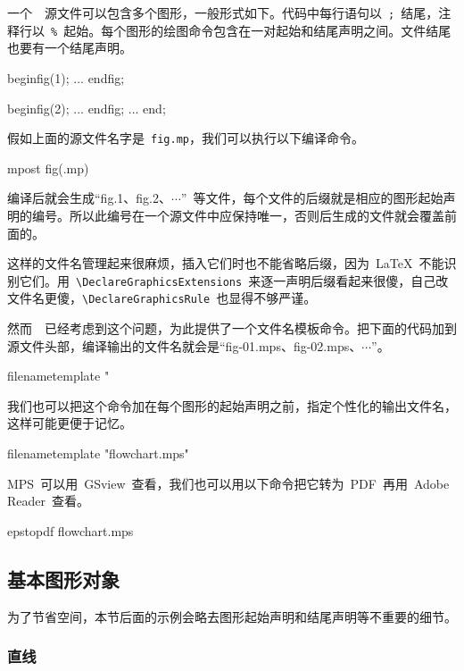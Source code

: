 一个~\MP~源文件可以包含多个图形，一般形式如下。代码中每行语句以~\verb|;|~结尾，注释行以~\verb|%|~起始。每个图形的绘图命令包含在一对起始和结尾声明之间。文件结尾也要有一个结尾声明。
\begin{code}
beginfig(1); %
...          %
endfig;      %

beginfig(2);
...
endfig;
...
end;         %
\end{code}

假如上面的源文件名字是~\verb|fig.mp|，我们可以执行以下编译命令。
\begin{code}
mpost fig(.mp)
\end{code}

编译后就会生成“fig.1、fig.2、$\cdots$”~等文件，每个文件的后缀就是相应的图形起始声明的编号。所以此编号在一个源文件中应保持唯一，否则后生成的文件就会覆盖前面的。

这样的文件名管理起来很麻烦，插入它们时也不能省略后缀，因为~\LaTeX~不能识别它们。用~\verb|\DeclareGraphicsExtensions|~来逐一声明后缀看起来很傻，自己改文件名更傻，\verb|\DeclareGraphicsRule|~也显得不够严谨。

然而~\MP~已经考虑到这个问题，为此提供了一个文件名模板命令。把下面的代码加到源文件头部，编译输出的文件名就会是“fig-01.mps、fig-02.mps、$\cdots$”。
\begin{code}
filenametemplate "%
\end{code}

我们也可以把这个命令加在每个图形的起始声明之前，指定个性化的输出文件名，这样可能更便于记忆。
\begin{code}
filenametemplate "flowchart.mps" %
\end{code}

MPS~可以用~GSview~查看，我们也可以用以下命令把它转为~PDF~再用~Adobe Reader~查看。

\begin{code}
epstopdf flowchart.mps
\end{code}

\subsection{基本图形对象}
为了节省空间，本节后面的示例会略去图形起始声明和结尾声明等不重要的细节。

\subsubsection{直线}


